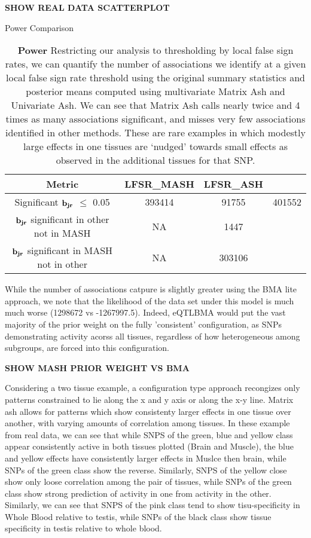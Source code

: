 \textbf{SHOW REAL DATA SCATTERPLOT}

\begin{table}[ht]
\caption{Power Comparison}
\centering
\begin{tabular}{c c c c}
\hline\hline
Metric & LFSR_{MASH} & LFSR_{ASH} \\ [0.5ex] %
\hline
Significant $\bf{b}_{jr}$ $\leq$ 0.05%
&393414 & 91755&401552\\
$\bf{b}_{jr}$ significant in other not in MASH %
&NA&1447 \\
$\bf{b}_{jr}$ significant in MASH not in other %
&NA&303106 \\[1ex]
\hline
\end{tabular}
\label{table:power}
\caption{\textbf{Power} Restricting our analysis to thresholding by local false sign rates, we can quantify the number of associations we identify at a given local false sign rate threshold using the original summary statistics and posterior means computed using multivariate Matrix Ash and Univariate Ash. We can see that Matrix Ash calls nearly twice and 4 times as many associations significant, and misses very few associations identified in other methods. These are rare examples in which modestly large effects in one tissues are `nudged' towards small effects as observed in the additional tissues for that SNP.}
\end{table}

While the number of associations catpure is slightly greater using the BMA lite approach, we note that the likelihood of the data set under this model is much much worse (1298672 vs -1267997.5). Indeed, eQTLBMA would put the vast majority of the prior weight on the fully 'consistent' configuration, as SNPs demonstrating activity acorss all tissues, regardless of how heterogeneous among subgroups, are forced into this configuration.  

\textbf{SHOW MASH PRIOR WEIGHT VS BMA}

Considering a two tissue example, a configuration type approach recongizes only patterns constrained to lie along the x and y axis or along the x-y line. Matrix ash allows for patterns which show consistenty larger effects in one tissue over another, with varying amounts of correlation among tissues. In these example from real data, we can see that while SNPS of the green, blue and yellow class appear consistently active in both tissues plotted (Brain and Muscle), the blue and yellow effects have consistently larger effects in Muslce then brain, while SNPs of the green class show the reverse. Similarly, SNPS of the yellow close show only loose correlation among the pair of tissues, while SNPs of the green class show strong prediction of activity in one from activity in the other.  Similarly, we can see that SNPS of the pink class tend to show tisu-specificity in Whole Blood relative to testis, while SNPs of the black class show tissue specificity in testis relative to whole blood.

